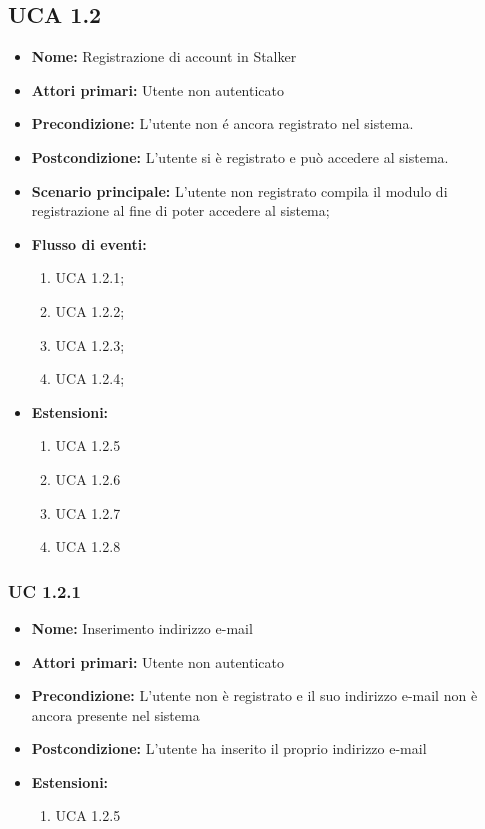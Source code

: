 \documentclass[a4paper, oneside, dvipsnames, table]{article} %
\begin{document}
\subsection{UCA 1.2}%
\begin{itemize}
\item \textbf{Nome:} Registrazione di account in Stalker
\item \textbf{Attori primari:} Utente non autenticato
\item \textbf{Precondizione:} L’utente non é ancora registrato nel sistema.
\item \textbf{Postcondizione:} L’utente si è registrato e può accedere al sistema.
\item \textbf{Scenario principale:} L'utente non registrato compila il modulo di registrazione al fine di poter accedere al sistema;%
\item \textbf{Flusso di eventi:} %
  \begin{enumerate}
        \item UCA 1.2.1;
        \item UCA 1.2.2;
        \item UCA 1.2.3;
        \item UCA 1.2.4;
    \end{enumerate}
\item \textbf{Estensioni:}
	\begin{enumerate}
		\item UCA 1.2.5 
		\item UCA 1.2.6 
		\item UCA 1.2.7 
		\item UCA 1.2.8 
	\end{enumerate}
\end{itemize}

\subsubsection{UC 1.2.1}%
\begin{itemize}
\item \textbf{Nome:} Inserimento indirizzo e-mail
\item \textbf{Attori primari:} Utente non autenticato
\item \textbf{Precondizione:} L’utente non è registrato e il suo indirizzo e-mail non è ancora presente nel sistema
\item \textbf{Postcondizione:}  L’utente ha inserito il proprio indirizzo e-mail
\item \textbf{Estensioni:}
	\begin{enumerate}
		\item UCA 1.2.5
	\end{enumerate}
\end{itemize}
\end{document}
